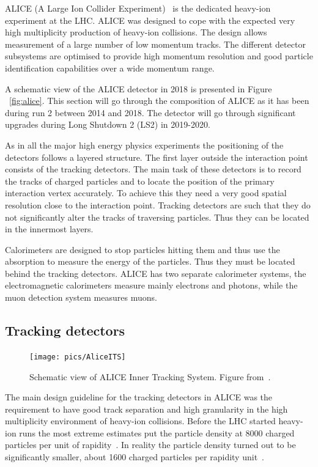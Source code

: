ALICE (A Large Ion Collider Experiment)~\cite{aliceDetector} is the dedicated heavy-ion experiment at the LHC. ALICE was designed to cope with the expected very high multiplicity production of heavy-ion collisions. The design allows measurement of a large number of low momentum tracks. The different detector subsystems are optimised to provide high momentum resolution and good particle identification capabilities over a wide momentum range.

A schematic view of the ALICE detector in 2018 is presented in Figure ~\ref{fig:alice}. This section will go through the composition of ALICE as it has been during run 2 between 2014 and 2018. The detector will go through significant upgrades during Long Shutdown 2 (LS2) in 2019-2020. 

As in all the major high energy physics experiments the positioning of the detectors follows a layered structure. The first layer outside the interaction point consists of the tracking detectors. The main task of these detectors is to record the tracks of charged particles and to locate the position of the primary interaction vertex accurately. To achieve this they need a very good spatial resolution close to the interaction point. Tracking detectors are such that they do not significantly alter the tracks of traversing particles. Thus they can be located in the innermost layers.

Calorimeters are designed to stop particles hitting them and thus use the absorption to measure the energy of the particles. Thus they must be located behind the tracking detectors. ALICE has two separate calorimeter systems, the electromagnetic calorimeters measure mainly electrons and photons, while the muon detection system measures muons.


\subsection{Tracking detectors}
\label{sec:tracking}

\begin{figure}[htb]
\centering
\texttt{[image: pics/AliceITS]}
\caption[ITS]{Schematic view of ALICE Inner Tracking System. Figure from~\cite{aliceDetector}.}
\label{fig:its}
\end{figure}


The main design guideline for the tracking detectors in ALICE was the requirement to have good track separation and high granularity in the high multiplicity environment of heavy-ion collisions. Before the LHC started heavy-ion runs the most extreme estimates put the particle density at 8000 charged particles per unit of rapidity~\cite{aliceDetector}. In reality the particle density turned out to be significantly smaller, about 1600 charged particles per rapidity unit~\cite{Aamodt:2010pb}.

